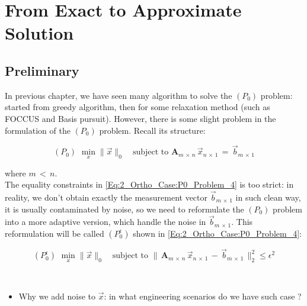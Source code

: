 \documentclass[12pt,a4paper]{book}
\begin{document}

\chapter{From Exact to Approximate Solution}

\section{Preliminary}

In previous chapter, we have seen many algorithm to solve the $(P_0)$ problem: started from greedy algorithm, then for some relaxation method (such as FOCCUS and Basis pursuit). However, there is some slight problem in the formulation of the $(P_0)$ problem. Recall its structure:

\begin{equation}
(P_0) \, \,   \min_x \lVert \vec{x} \rVert_0 \quad \text{subject to }  \boldsymbol A_{m \, \times \, n} \, \Vec{x}_{n \, \times \, 1} \, = \, \Vec{b}_{m \, \times \, 1}
\label{Eq:2_Ortho_Case:P0_Problem_4}
\end{equation}

where $m \, < \, n$.\\

The equality constraints in \autoref{Eq:2_Ortho_Case:P0_Problem_4} is too strict: in reality, we don't obtain exactly the measurement vector $\Vec{b}_{m \, \times \, 1}$ in such clean way, it is usually contaminated by noise, so we need to reformulate the $(P_0)$ problem into a more adaptive version, which handle the noise in  $\Vec{b}_{m \, \times \, 1}$. This reformulation will be called $(P_0^{\epsilon})$ shown in \autoref{Eq:2_Ortho_Case:P0_Problem_4}:


\begin{equation}
(P_0^{\epsilon}) \, \,   \min_x \lVert \vec{x} \rVert_0 \quad \text{subject to }  \lVert \,  \boldsymbol A_{m \, \times \, n} \, \Vec{x}_{n \, \times \, 1} \, - \, \Vec{b}_{m \, \times \, 1} \, \rVert_2^2 \leq \epsilon^2
\label{Eq:2_Ortho_Case:P0_Problem_4}
\end{equation}


\\

\begin{itemize}
    \item Why we add noise to $\vec{x}$: in what engineering scenarios do we have such case ?
\end{itemize}
\end{document}
